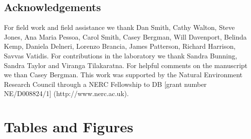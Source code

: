 \documentclass[12pt]{article}
\begin{document}
\begin{linenumbers}
\clearpage




\section*{Acknowledgements}
\label{Acknowledgements}

For field work and field assistance we thank Dan Smith, Cathy Walton, Steve Jones, Ana Maria Pessoa, Carol Smith, Casey Bergman, Will Davenport, Belinda Kemp, Daniela Delneri, Lorenzo Brancia, James Patterson, Richard Harrison, Savvas Vatidis. For contributions in the laboratory we thank Sandra Bunning, Sandra Taylor and Viranga Tilakaratna. For helpful comments on the manuscript we than Casey Bergman. This work was supported by the Natural Environment Research Council through a NERC Fellowship to DB [grant number NE/D008824/1] (http://www.nerc.ac.uk). 

\clearpage



{\footnotesize \linespread{1}
}
\end{linenumbers}
\clearpage







\section*{Tables and Figures}
\end{document}

